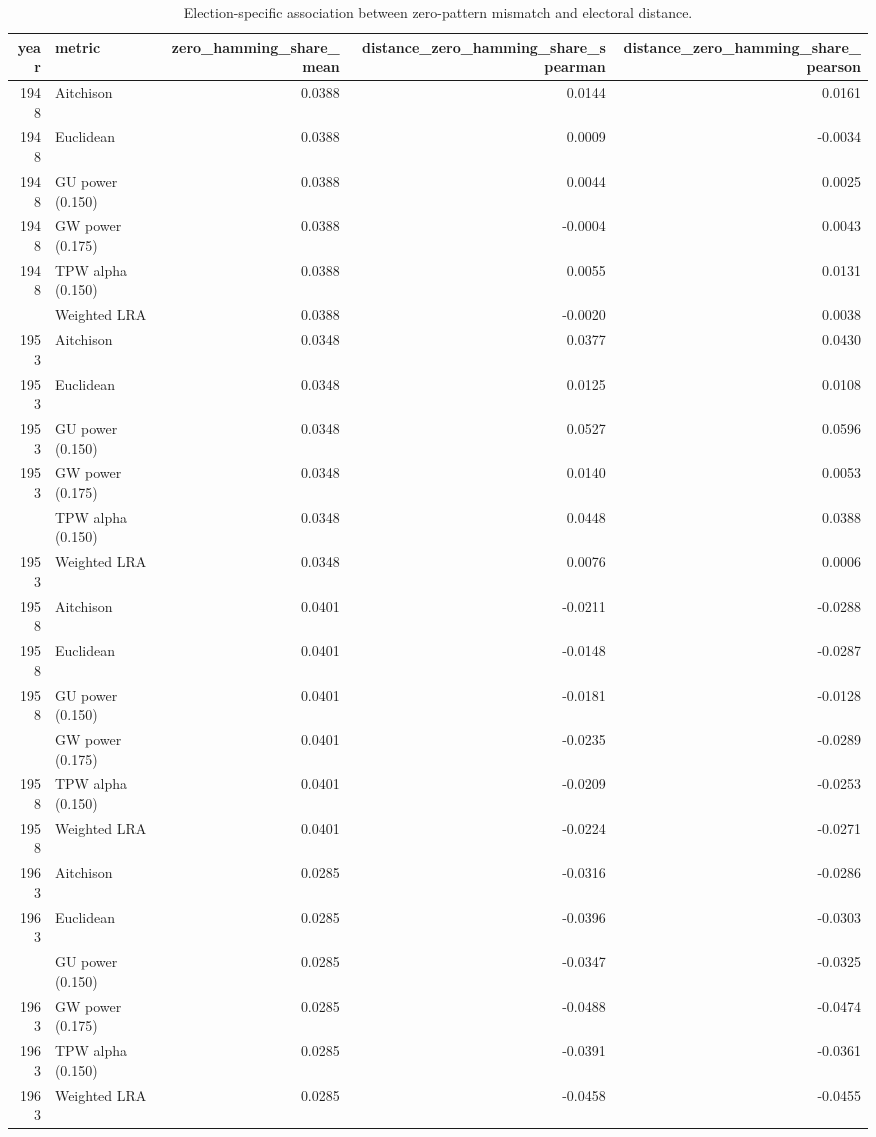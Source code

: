 
\begin{longtable}[t]{rlrrr}
\caption{\label{tab:app_zero_hamming}Election-specific association between zero-pattern mismatch and electoral distance.}\\
\toprule
year & metric & zero\_hamming\_share\_mean & distance\_zero\_hamming\_share\_spearman & distance\_zero\_hamming\_share\_pearson\\
\midrule
1948 & Aitchison & 0.0388 & 0.0144 & 0.0161\\
1948 & Euclidean & 0.0388 & 0.0009 & -0.0034\\
1948 & GU power (0.150) & 0.0388 & 0.0044 & 0.0025\\
1948 & GW power (0.175) & 0.0388 & -0.0004 & 0.0043\\
1948 & TPW alpha (0.150) & 0.0388 & 0.0055 & 0.0131\\
\addlinespace
1948 & Weighted LRA & 0.0388 & -0.0020 & 0.0038\\
1953 & Aitchison & 0.0348 & 0.0377 & 0.0430\\
1953 & Euclidean & 0.0348 & 0.0125 & 0.0108\\
1953 & GU power (0.150) & 0.0348 & 0.0527 & 0.0596\\
1953 & GW power (0.175) & 0.0348 & 0.0140 & 0.0053\\
\addlinespace
1953 & TPW alpha (0.150) & 0.0348 & 0.0448 & 0.0388\\
1953 & Weighted LRA & 0.0348 & 0.0076 & 0.0006\\
1958 & Aitchison & 0.0401 & -0.0211 & -0.0288\\
1958 & Euclidean & 0.0401 & -0.0148 & -0.0287\\
1958 & GU power (0.150) & 0.0401 & -0.0181 & -0.0128\\
\addlinespace
1958 & GW power (0.175) & 0.0401 & -0.0235 & -0.0289\\
1958 & TPW alpha (0.150) & 0.0401 & -0.0209 & -0.0253\\
1958 & Weighted LRA & 0.0401 & -0.0224 & -0.0271\\
1963 & Aitchison & 0.0285 & -0.0316 & -0.0286\\
1963 & Euclidean & 0.0285 & -0.0396 & -0.0303\\
\addlinespace
1963 & GU power (0.150) & 0.0285 & -0.0347 & -0.0325\\
1963 & GW power (0.175) & 0.0285 & -0.0488 & -0.0474\\
1963 & TPW alpha (0.150) & 0.0285 & -0.0391 & -0.0361\\
1963 & Weighted LRA & 0.0285 & -0.0458 & -0.0455\\

\end{longtable}

